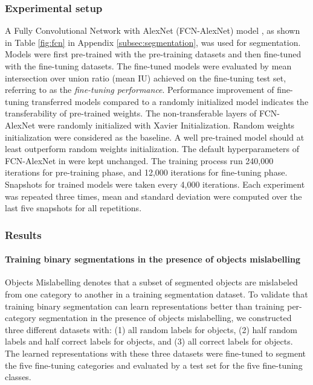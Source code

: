 \subsubsection{Experimental setup}
\label{subsubsec:ptft}
A Fully Convolutional Network with AlexNet (FCN-AlexNet) model \cite{long2015fully}, as shown in Table \ref{fig:fcn} in Appendix \ref{subsec:segmentation}, was used for segmentation.
Models were first pre-trained with the pre-training datasets and then fine-tuned with the fine-tuning datasets.
The fine-tuned models were evaluated by mean intersection over union ratio (mean IU) achieved on the fine-tuning test set, referring to as the \textit{fine-tuning performance}.
Performance improvement of fine-tuning transferred models compared to a randomly initialized model indicates the transferability of pre-trained weights.
The non-transferable layers of FCN-AlexNet were randomly initialized with Xavier Initialization.
Random weights initialization were considered as the baseline.
A well pre-trained model should at least outperform random weights initialization.
The default hyperparameters of FCN-AlexNet in  \cite{long2015fully} were kept unchanged.
The training process run 240,000 iterations for pre-training phase, and 12,000 iterations for fine-tuning phase.
Snapshots for trained models were taken every 4,000 iterations.
Each experiment was repeated three times, mean and standard deviation were computed over the last five snapshots for all repetitions.




\subsubsection{Results}



\paragraph{Training binary segmentations in the presence of objects mislabelling}
Objects Mislabelling denotes that a subset of segmented objects are mislabeled from one category to another in a training segmentation dataset.
To validate that training binary segmentation can learn representations better than training per-category segmentation in the presence of objects mislabelling, we constructed three different datasets with: (1) all random labels for objects, (2) half random labels and half correct labels for objects, and (3) all correct labels for objects.
The learned representations with these three datasets were fine-tuned to segment the five fine-tuning categories and evaluated by a test set for the five fine-tuning classes.

